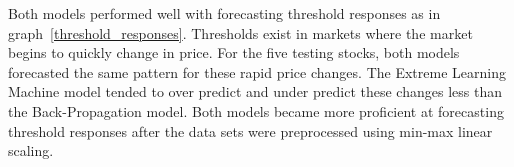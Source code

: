 Both models performed well with forecasting threshold responses as in graph~\ref{threshold_responses}.
Thresholds exist in markets where the market begins to quickly change in price.
For the five testing stocks, both models forecasted the same pattern for these rapid price changes.
The Extreme Learning Machine model tended to over predict and under predict these changes less than the Back-Propagation model.
Both models became more proficient at forecasting threshold responses after the data sets were preprocessed using min-max linear scaling.

